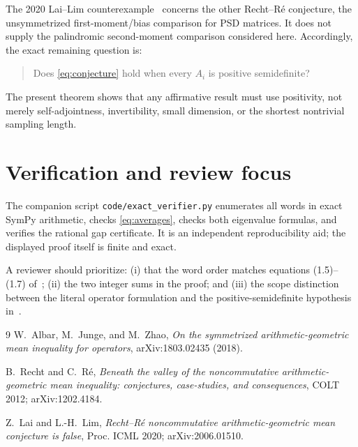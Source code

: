 \documentclass[11pt,a4paper]{article}
\begin{document}
The 2020 Lai--Lim counterexample~\cite{LL} concerns the other Recht--R\'e
conjecture, the unsymmetrized first-moment/bias comparison for PSD matrices.  It
does not supply the palindromic second-moment comparison considered here.
Accordingly, the exact remaining question is:
\begin{quote}
Does \eqref{eq:conjecture} hold when every $A_i$ is positive semidefinite?
\end{quote}
The present theorem shows that any affirmative result must use positivity, not
merely self-adjointness, invertibility, small dimension, or the shortest
nontrivial sampling length.

\section{Verification and review focus}

The companion script \texttt{code/exact\_verifier.py} enumerates all words in
exact SymPy arithmetic, checks \eqref{eq:averages}, checks both eigenvalue
formulas, and verifies the rational gap certificate.  It is an independent
reproducibility aid; the displayed proof itself is finite and exact.

A reviewer should prioritize: (i) that the word order matches equations
(1.5)--(1.7) of~\cite{AJZ}; (ii) the two integer sums in the proof; and (iii)
the scope distinction between the literal operator formulation and the
positive-semidefinite hypothesis in~\cite{RR}.

\begin{thebibliography}{9}
W.~Albar, M.~Junge, and M.~Zhao,
\emph{On the symmetrized arithmetic-geometric mean inequality for operators},
arXiv:1803.02435 (2018).

B.~Recht and C.~R\'e,
\emph{Beneath the valley of the noncommutative arithmetic-geometric mean
inequality: conjectures, case-studies, and consequences},
COLT 2012; arXiv:1202.4184.

Z.~Lai and L.-H.~Lim,
\emph{Recht--R\'e noncommutative arithmetic-geometric mean conjecture is
false}, Proc. ICML 2020; arXiv:2006.01510.
\end{thebibliography}
\end{document}
